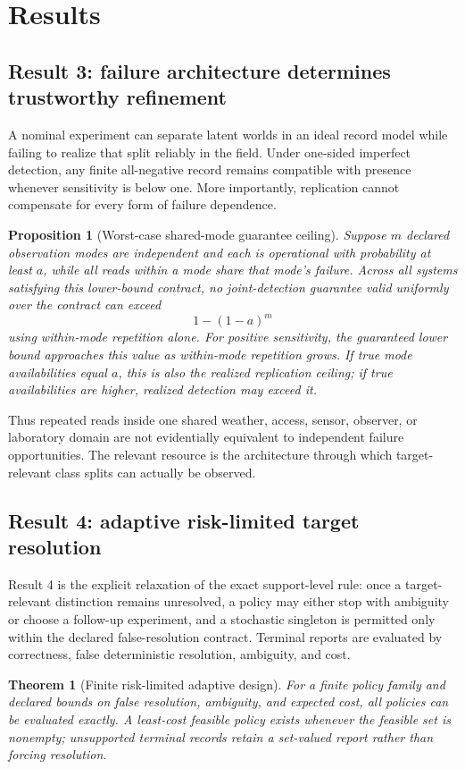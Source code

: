 \documentclass[11pt]{article}
\newtheorem{theorem}{Theorem}
\newtheorem{proposition}{Proposition}
\begin{document}
\section{Results}
\subsection{Result 3: failure architecture determines trustworthy refinement}
A nominal experiment can separate latent worlds in an ideal record model while failing to realize that split reliably in the field. Under one-sided imperfect detection, any finite all-negative record remains compatible with presence whenever sensitivity is below one. More importantly, replication cannot compensate for every form of failure dependence.

\begin{proposition}[Worst-case shared-mode guarantee ceiling]
Suppose $m$ declared observation modes are independent and each is operational with probability at least $a$, while all reads within a mode share that mode's failure. Across all systems satisfying this lower-bound contract, no joint-detection guarantee valid uniformly over the contract can exceed
\[
1-(1-a)^m
\]
using within-mode repetition alone. For positive sensitivity, the guaranteed lower bound approaches this value as within-mode repetition grows. If true mode availabilities equal $a$, this is also the realized replication ceiling; if true availabilities are higher, realized detection may exceed it.
\end{proposition}

Thus repeated reads inside one shared weather, access, sensor, observer, or laboratory domain are not evidentially equivalent to independent failure opportunities. The relevant resource is the architecture through which target-relevant class splits can actually be observed.

\subsection{Result 4: adaptive risk-limited target resolution}
Result 4 is the explicit relaxation of the exact support-level rule: once a target-relevant distinction remains unresolved, a policy may either stop with ambiguity or choose a follow-up experiment, and a stochastic singleton is permitted only within the declared false-resolution contract. Terminal reports are evaluated by correctness, false deterministic resolution, ambiguity, and cost.

\begin{theorem}[Finite risk-limited adaptive design]
For a finite policy family and declared bounds on false resolution, ambiguity, and expected cost, all policies can be evaluated exactly. A least-cost feasible policy exists whenever the feasible set is nonempty; unsupported terminal records retain a set-valued report rather than forcing resolution.
\end{theorem}
\end{document}
